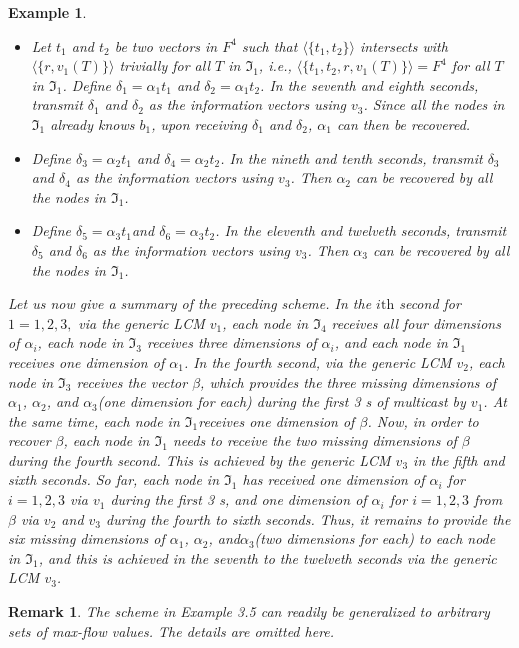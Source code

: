 \documentclass{IEEEtran}
\newtheorem{exam}{Example}
\newtheorem{rema}{Remark}
\begin{document}
\begin{exam}
\begin{itemize}
		\item[d)] Let $t_1$ and $t_2$ be two vectors in $F^4$ such that $\langle \{t_1,t_2\}\rangle$ intersects with $\langle \{r,v_1(T)\}\rangle$ trivially for all $T$ in $\Im_1$, i.e., $\langle \{t_1,t_2,r, v_1(T)\}\rangle = F^4$ for all $T$ in $\Im_1$. Define $\delta_1=\alpha_1t_1$ and $\delta_2=\alpha_1t_2$. In the seventh and eighth seconds, transmit $\delta_1$ and $\delta_2$ as the information vectors using $v_3$. Since all the nodes in $\Im_1$ already knows $b_1$, upon receiving $\delta_1$ and $\delta_2$, $\alpha_1$ can then be recovered.
		\item[e)] Define $\delta_3=\alpha_2t_1$ and $\delta_4=\alpha_2t_2$. In the nineth and tenth seconds, transmit $\delta_3$ and $\delta_4$ as the information vectors using $v_3$. Then $\alpha_2$ can be recovered by all the nodes in $\Im_1$.
		\item[f)] Define $\delta_5=\alpha_3t_1$and $\delta_6=\alpha_3t_2$. In the eleventh and twelveth seconds, transmit $\delta_5$ and $\delta_6$ as the information vectors using $v_3$. Then $\alpha_3$ can be recovered by all the nodes in $\Im_1$.
	\end{itemize}
Let us now give a summary of the preceding scheme. In the $i\text{th}$ second for $1=1,2,3,$ via the generic LCM $v_1$, each node in $\Im_4$ receives all four dimensions of $\alpha_i$, each node in $\Im_3$ receives three dimensions of $\alpha_i$, and each node in $\Im_1$ receives one dimension of $\alpha_1$. In the fourth second, via the generic LCM $v_2$, each node in $\Im_3$ receives the vector $\beta$, which provides the three missing dimensions of $\alpha_1$, $\alpha_2$, and $\alpha_3$(one dimension for each) during the first 3 s of multicast by $v_1$. At the same time, each node in $\Im_1$receives one dimension of $\beta$. Now, in order to recover $\beta$, each node in $\Im_1$ needs to receive the two missing dimensions of $\beta$ during the fourth second. This is achieved by the generic LCM $v_3$ in the fifth and sixth seconds. So far, each node in $\Im_1$ has received one dimension of $\alpha_i$ for $i=1,2,3$ via $v_1$ during the first 3 s, and one dimension of $\alpha_i$ for $i=1,2,3$ from $\beta$ via $v_2$ and $v_3$ during the fourth to sixth seconds. Thus, it remains to provide the six missing dimensions of $\alpha_1$, $\alpha_2$, and$\alpha_3$(two dimensions for each) to each node in $\Im_1$, and this is achieved in the seventh to the twelveth seconds via the generic LCM $v_3$.
\end{exam}
\begin{rema}
	The scheme in Example 3.5 can readily be generalized to arbitrary sets of max-flow values. The details are omitted here.
\end{rema}
\end{document}
